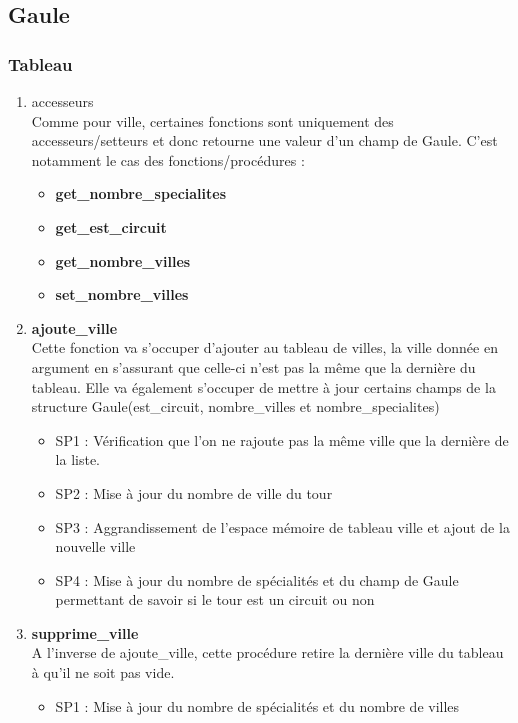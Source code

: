 \documentclass[a4paper, 11pt, oneside]{article}
\begin{document}
\subsection{\textbf{Gaule}}
\subsubsection{Tableau}
\begin{enumerate}
    \item accesseurs
    \\Comme pour ville, certaines fonctions sont uniquement des accesseurs/setteurs 
    et donc retourne une valeur d'un champ de Gaule. C'est notamment le cas des 
    fonctions/procédures : 
    \begin{itemize}
    \item \textbf{get\_nombre\_specialites} 
    \item \textbf{get\_est\_circuit} 
    \item \textbf{get\_nombre\_villes}
    \item \textbf{set\_nombre\_villes}
    \end{itemize}   
    \item \textbf{ajoute\_ville}
    \\Cette fonction va s'occuper d'ajouter au tableau de villes, la ville donnée en argument 
    en s'assurant que celle-ci n'est pas la même que la dernière du tableau. Elle va également 
    s'occuper de mettre à jour certains champs de la structure Gaule(est\_circuit, nombre\_villes et 
    nombre\_specialites)
    \begin{itemize}
        \item SP1 : Vérification que l'on ne rajoute pas la même ville que la dernière de la liste.
        \item SP2 : Mise à jour du nombre de ville du tour
        \item SP3 : Aggrandissement de l'espace mémoire de tableau ville et ajout de la nouvelle ville
        \item SP4 : Mise à jour du nombre de spécialités et du champ de Gaule permettant de savoir 
        si le tour est un circuit ou non
    \end{itemize}
    \item \textbf{supprime\_ville}
    \\A l'inverse de ajoute\_ville, cette procédure retire la dernière ville du tableau à
    qu'il ne soit pas vide.
    \begin{itemize}
        \item SP1 : Mise à jour du nombre de spécialités et du nombre de villes

\end{itemize}
\end{enumerate}
\end{document}
